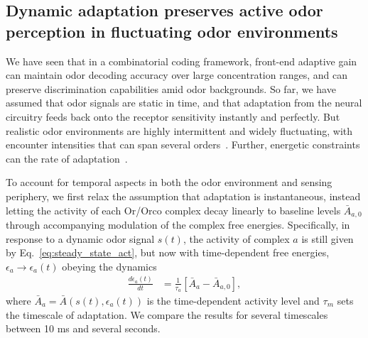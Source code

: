 


\subsection{Dynamic adaptation preserves active odor perception in fluctuating odor environments}
We have seen that in a combinatorial coding framework, front-end adaptive gain can maintain odor decoding accuracy over large concentration ranges, and can preserve discrimination capabilities amid odor backgrounds. So far, we have assumed that odor signals are static in time, and that adaptation from the neural circuitry feeds back onto the receptor sensitivity instantly and perfectly. But realistic odor environments are highly intermittent and widely fluctuating, with encounter intensities that can span several orders~\cite{celani}. Further, energetic constraints can the rate of adaptation~\cite{ESA}.

To account for temporal aspects in both the odor environment and sensing periphery, we first relax the assumption that adaptation is instantaneous, instead letting the activity of each Or/Orco complex decay linearly to baseline levels $\bar{A}_{a, 0}$ through accompanying modulation of the complex free energies. Specifically, in response to a dynamic odor signal $s(t)$, the activity of complex $a$ is still given by Eq.~\ref{eq:steady_state_act}, but now with time-dependent free energies, $\epsilon_a \rightarrow \epsilon_a(t)$ obeying the dynamics
\begin{align}
\frac{d\epsilon_a(t)}{dt} &= \frac{1}{\tau_a}\left[\bar{A}_a - \bar {A}_{a,0}\right],
\end{align}
where $\bar {A}_a = \bar{A}(s(t), \epsilon_a(t))$ is the time-dependent activity level and $\tau_m$ sets the timescale of adaptation. We compare the results for several timescales between 10 ms and several seconds.






